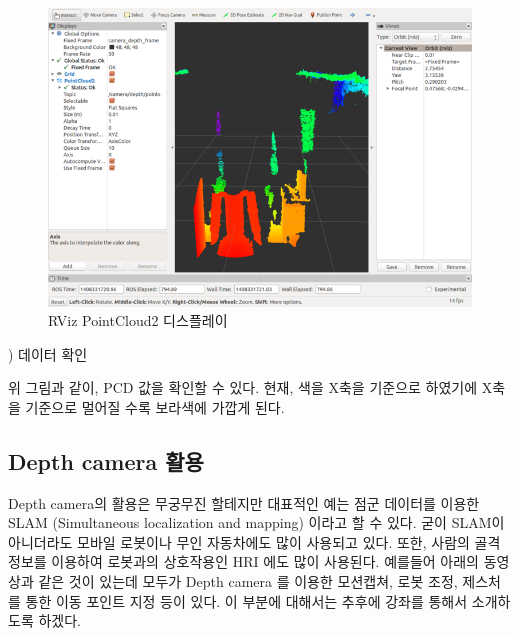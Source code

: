 \begin{figure}[h]
\centering\includegraphics[width=0.9\columnwidth]{pictures/chapter9/rviz_pc2.png}
\caption{RViz PointCloud2 디스플레이}
\end{figure}

\vspace{\baselineskip}
\noindent
{}
\thenum) 데이터 확인

위 그림과 같이, PCD 값을 확인할 수 있다. 현재, 색을 X축을 기준으로 하였기에 X축을 기준으로 멀어질 수록 보라색에 가깝게 된다.

\subsection{Depth camera 활용}

Depth camera의 활용은 무궁무진 할테지만 대표적인 예는 점군 데이터를 이용한 SLAM (Simultaneous localization and mapping) 이라고 할 수 있다. 굳이 SLAM이 아니더라도 모바일 로봇이나 무인 자동차에도 많이 사용되고 있다. 또한, 사람의 골격 정보를 이용하여 로봇과의 상호작용인 HRI 에도 많이 사용된다. 예를들어 아래의 동영상과 같은 것이 있는데 모두가 Depth camera 를 이용한 모션캡쳐, 로봇 조정, 제스처를 통한 이동 포인트 지정 등이 있다. 이 부분에 대해서는 추후에 강좌를 통해서 소개하도록 하겠다.






